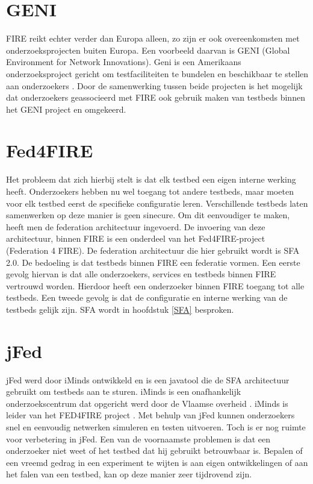 \section{GENI}
\npar
FIRE reikt echter verder dan Europa alleen, zo zijn er ook overeenkomsten met onderzoeksprojecten buiten Europa. Een voorbeeld daarvan is GENI (Global Environment for Network Innovations). Geni is een Amerikaans onderzoeksproject gericht om testfaciliteiten te bundelen en beschikbaar te stellen aan onderzoekers \citep{geni-what-is}. Door de samenwerking tussen beide projecten is het mogelijk dat onderzoekers geassocieerd met FIRE ook gebruik maken van testbeds binnen het GENI project en omgekeerd.

\section{Fed4FIRE}
\npar
Het probleem dat zich hierbij stelt is dat elk testbed een eigen interne werking heeft. Onderzoekers hebben nu wel toegang tot andere testbeds, maar moeten voor elk testbed eerst de specifieke configuratie leren. Verschillende testbeds laten samenwerken op deze manier is geen sinecure. Om dit eenvoudiger te maken, heeft men de federation architectuur ingevoerd. 
\npar
De invoering van deze architectuur, binnen FIRE is een onderdeel van het Fed4FIRE-project (Federation 4 FIRE). De federation architectuur die hier gebruikt wordt is SFA 2.0. De bedoeling is dat testbeds binnen FIRE een federatie vormen. Een eerste gevolg hiervan is dat alle onderzoekers, services en testbeds binnen FIRE vertrouwd worden. Hierdoor heeft een onderzoeker binnen FIRE toegang tot alle testbeds. Een tweede gevolg is dat de configuratie en interne werking van de testbeds gelijk zijn. SFA wordt in hoofdstuk \ref{SFA} besproken.

\section{jFed}
\npar
jFed werd door iMinds ontwikkeld \citep{iminds-jFed} en is een javatool die de SFA architectuur gebruikt om testbeds aan te sturen. iMinds is een onafhankelijk onderzoekscentrum dat opgericht werd door de Vlaamse overheid \citep{iMinds-what-is}. iMinds is leider van het FED4FIRE project \citep{iminds-FED4FIRE}.
\npar
Met behulp van jFed kunnen onderzoekers snel en eenvoudig netwerken simuleren en testen uitvoeren. Toch is er nog ruimte voor verbetering in jFed. Een van de voornaamste problemen is dat een onderzoeker niet weet of het testbed dat hij gebruikt betrouwbaar is. Bepalen of een vreemd gedrag in een experiment te wijten is aan eigen ontwikkelingen of aan het falen van een testbed, kan op deze manier zeer tijdrovend zijn.

